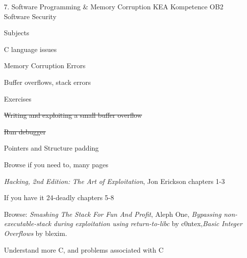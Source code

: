 \documentclass[Screen16to9,17pt]{foils}
\begin{document}
\mytitlepage
{7. Software Programming \& Memory Corruption}
{KEA Kompetence OB2 Software Security}


\begin{list1}
\item Subjects
\begin{list2}
\item C language issues
\item Memory Corruption Errors
\item Buffer overflows, stack errors
\end{list2}
\item Exercises
\begin{list2}
\item \sout{Writing and exploiting a small buffer overflow}
\item \sout{Run debugger}
\item Pointers and Structure padding
\end{list2}
\end{list1}


\centerline{Browse if you need to, many pages}

\begin{list1}
\item \emph{Hacking, 2nd Edition: The Art of Exploitation}, Jon Erickson chapters 1-3
\item If you have it 24-deadly chapters 5-8
\item Browse: \emph{Smashing The Stack For Fun And Profit}, Aleph One, \emph{Bypassing non-executable-stack during exploitation using return-to-libc} by c0ntex,\emph{Basic Integer Overflows} by blexim.


\end{list1}



\begin{list1}
\item Understand more C, and problems associated with C
\end{list1}


\end{document}
